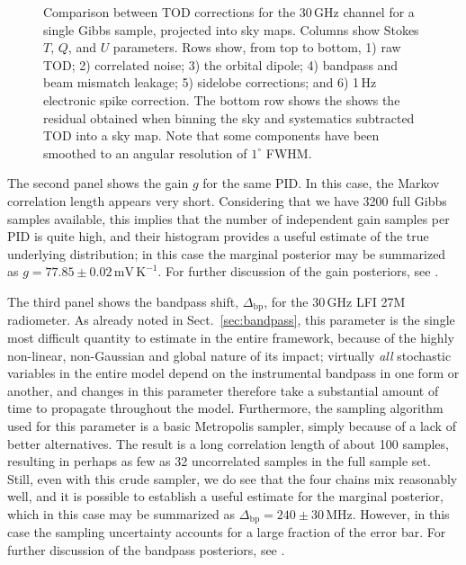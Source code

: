\documentclass[onecolumn]{aa}
\newcommand{\Dbp}[0]{\Delta_{\mathrm{bp}}}
\begin{document}
\begin{figure}[p]
  \caption{Comparison between TOD corrections for the 30\,GHz channel
    for a single Gibbs sample, projected into sky maps. Columns show
    Stokes $T$, $Q$, and $U$ parameters. Rows show, from top to
    bottom, 1) raw TOD; 2) correlated noise; 3) the orbital dipole; 4)
    bandpass and beam mismatch leakage; 5) sidelobe corrections; and
    6) 1\,Hz electronic spike correction. The bottom row shows the
    shows the residual obtained when binning the sky and systematics
    subtracted TOD into a sky map. Note that some components have been
    smoothed to an angular resolution of $1^{\circ}$ FWHM.  }\label{fig:corrmaps}
\end{figure}

The second panel shows the gain $g$ for the same PID. In this case,
the Markov correlation length appears very short. Considering that we
have 3200 full Gibbs samples available, this implies that the number
of independent gain samples per PID is quite high, and their histogram
provides a useful estimate of the true underlying distribution; in
this case the marginal posterior may be summarized as
$g=77.85\pm0.02\,\textrm{mV}\,\mathrm{K}^{-1}$. For further discussion
of the gain posteriors, see \citet{bp07}.

The third panel shows the bandpass shift, $\Dbp$, for the 30\,GHz LFI
27M radiometer. As already noted in Sect.~\ref{sec:bandpass}, this
parameter is the single most difficult quantity to estimate in the
entire framework, because of the highly non-linear, non-Gaussian and
global nature of its impact; virtually \emph{all} stochastic variables
in the entire model depend on the instrumental bandpass in one form or
another, and changes in this parameter therefore take a substantial
amount of time to propagate throughout the model. Furthermore, the
sampling algorithm used for this parameter is a basic Metropolis
sampler, simply because of a lack of better alternatives. The result
is a long correlation length of about 100 samples, resulting in
perhaps as few as 32 uncorrelated samples in the full sample
set. Still, even with this crude sampler, we do see that the four
chains mix reasonably well, and it is possible to establish a useful
estimate for the marginal posterior, which in this case may be
summarized as $\Dbp = 240\pm30\,\textrm{MHz}$. However, in this case
the sampling uncertainty accounts for a large fraction of the error
bar. For further discussion of the bandpass posteriors, see
\citet{bp09}.
\end{document}
